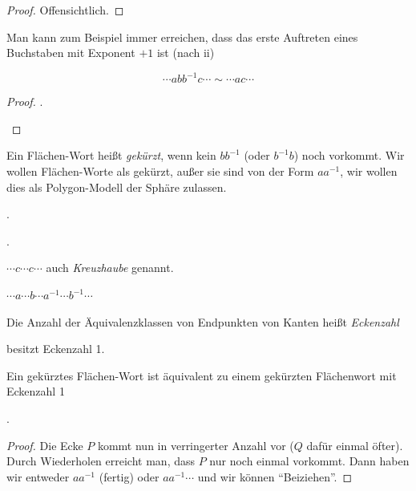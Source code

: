 \documentclass[a4paper,10pt]{scrartcl}
\begin{document}
\begin{proof}
 Offensichtlich.
\end{proof}
Man kann zum Beispiel immer erreichen, dass das erste Auftreten eines Buchstaben mit Exponent $+1$ ist (nach ii)
\begin{lem}[Beiziehen]
 \[
  \dotsb abb^{-1}c\dotsb  \sim \dotsb ac\dotsb 
 \]
\end{lem}
\begin{proof}
.
 \begin{figure}[H]
 \centering
\fixme[fig141]
\caption{}
\end{figure}
\end{proof}

Ein Flächen-Wort heißt \emph{gekürzt}, wenn kein $bb^{-1}$ (oder $b^{-1}b$) noch vorkommt. Wir wollen Flächen-Worte als gekürzt, außer sie sind von der Form $aa^{-1}$, wir wollen dies als Polygon-Modell der Sphäre zulassen.

\begin{note*}
.
 \begin{figure}[H]
 \centering
\fixme[fig142]
\caption{}
\end{figure}
\end{note*}

\begin{note*}
.
 \begin{figure}[H]
 \centering
\fixme[fig143]
\caption{}
\end{figure}
$\dotsb c\dotsb c\dotsb $ auch \emph{Kreuzhaube} genannt.
\end{note*}

\begin{note*}[Henkel]
$\dotsb a\dotsb b\dotsb a^{-1}\dotsb b^{-1}\dotsb $
 \begin{figure}[H]
 \centering
\fixme[fig144]
\caption{}
\end{figure}
\end{note*}
Die Anzahl der Äquivalenzklassen von Endpunkten von Kanten heißt \emph{Eckenzahl}
\begin{figure}[H]
 \centering
\fixme[fig145]
\caption{}
\end{figure}

besitzt Eckenzahl 1.

\begin{lem}\label{thm3:1.19}
 Ein gekürztes Flächen-Wort ist äquivalent zu einem gekürzten Flächenwort mit Eckenzahl 1
\end{lem}
\begin{ex*}
.
 \begin{figure}[H]
 \centering
\fixme[fig146]
\caption{}
\end{figure}
\end{ex*}
\begin{proof}
 Die Ecke $P$ kommt nun in verringerter Anzahl vor ($Q$ dafür einmal öfter). Durch Wiederholen erreicht man, dass $P$ nur noch einmal vorkommt. Dann haben wir entweder $aa^{-1}$ (fertig) oder $aa^{-1}\dotsb $ und wir können "`Beiziehen"'.
\end{proof}
\end{document}

